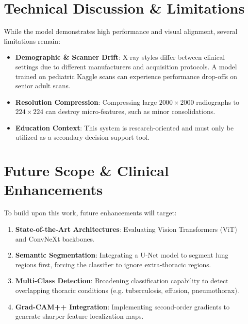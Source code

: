 \documentclass[12pt,oneside]{report}
\begin{document}
\section{Technical Discussion \& Limitations}
While the model demonstrates high performance and visual alignment, several limitations remain:
\begin{itemize}[label=\textbullet]
    \item \textbf{Demographic \& Scanner Drift}: X-ray styles differ between clinical settings due to different manufacturers and acquisition protocols. A model trained on pediatric Kaggle scans can experience performance drop-offs on senior adult scans.
    \item \textbf{Resolution Compression}: Compressing large $2000\times2000$ radiographs to $224\times224$ can destroy micro-features, such as minor consolidations.
    \item \textbf{Education Context}: This system is research-oriented and must only be utilized as a secondary decision-support tool.
\end{itemize}

\section{Future Scope \& Clinical Enhancements}
To build upon this work, future enhancements will target:
\begin{enumerate}
    \item \textbf{State-of-the-Art Architectures}: Evaluating Vision Transformers (ViT) and ConvNeXt backbones.
    \item \textbf{Semantic Segmentation}: Integrating a U-Net model to segment lung regions first, forcing the classifier to ignore extra-thoracic regions.
    \item \textbf{Multi-Class Detection}: Broadening classification capability to detect overlapping thoracic conditions (e.g. tuberculosis, effusion, pneumothorax).
    \item \textbf{Grad-CAM++ Integration}: Implementing second-order gradients to generate sharper feature localization maps.
\end{enumerate}
\end{document}
